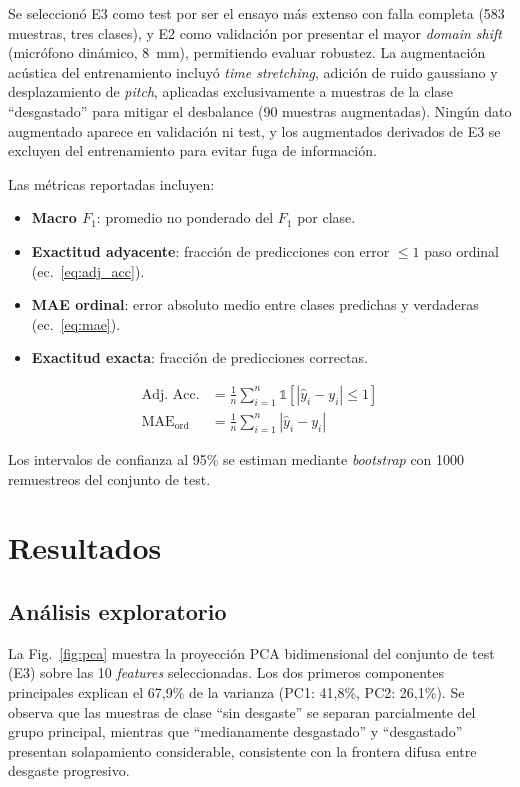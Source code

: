 \documentclass[10pt,twocolumn]{article}
\begin{document}
Se seleccionó E3 como test por ser el ensayo más extenso con falla
completa (583 muestras, tres clases), y E2 como validación por presentar
el mayor \textit{domain shift} (micrófono dinámico, 8~mm), permitiendo
evaluar robustez. La augmentación acústica del entrenamiento incluyó
\textit{time stretching}, adición de ruido gaussiano y desplazamiento de
\textit{pitch}, aplicadas exclusivamente a muestras de la clase
``desgastado'' para mitigar el desbalance (90 muestras augmentadas).
Ningún dato augmentado aparece en validación ni test, y los augmentados
derivados de E3 se excluyen del entrenamiento para evitar fuga de
información.

Las métricas reportadas incluyen:
\begin{itemize}
  \item \textbf{Macro $F_1$}: promedio no ponderado del $F_1$ por clase.
  \item \textbf{Exactitud adyacente}: fracción de predicciones con error
    $\leq 1$ paso ordinal (ec.~\ref{eq:adj_acc}).
  \item \textbf{MAE ordinal}: error absoluto medio entre clases predichas
    y verdaderas (ec.~\ref{eq:mae}).
  \item \textbf{Exactitud exacta}: fracción de predicciones correctas.
\end{itemize}

\begin{align}
\text{Adj.\ Acc.} &= \frac{1}{n} \sum_{i=1}^{n} \mathbb{1}[|\hat{y}_i - y_i| \leq 1]
\label{eq:adj_acc} \\
\text{MAE}_{\text{ord}} &= \frac{1}{n} \sum_{i=1}^{n} |\hat{y}_i - y_i|
\label{eq:mae}
\end{align}

Los intervalos de confianza al 95\% se estiman mediante
\textit{bootstrap} con 1000 remuestreos del conjunto de test.

\section{Resultados}
\label{sec:resultados}

\subsection{Análisis exploratorio}

La Fig.~\ref{fig:pca} muestra la proyección PCA bidimensional del
conjunto de test (E3) sobre las 10 \textit{features} seleccionadas. Los
dos primeros componentes principales explican el 67{,}9\% de la
varianza (PC1: 41{,}8\%, PC2: 26{,}1\%). Se observa que las muestras
de clase ``sin desgaste'' se separan parcialmente del grupo principal,
mientras que ``medianamente desgastado'' y ``desgastado'' presentan
solapamiento considerable, consistente con la frontera difusa entre
desgaste progresivo.
\end{document}
